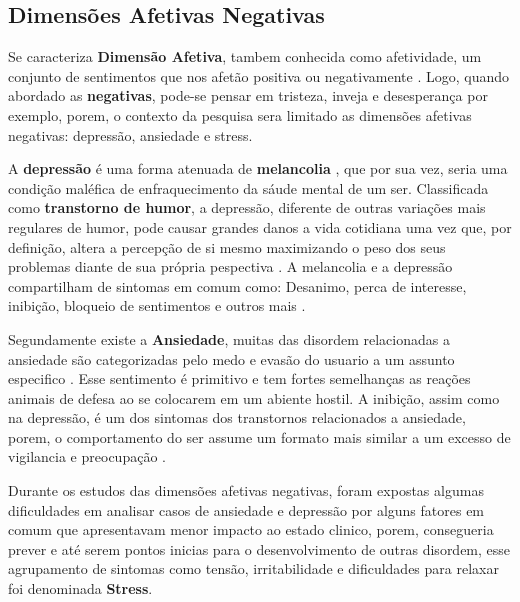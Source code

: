 \subsection{Dimensões Afetivas Negativas}
Se caracteriza \textbf{Dimensão Afetiva}, tambem conhecida como afetividade, um conjunto de sentimentos que nos afetão positiva ou negativamente \cite{pinto2009afetos}. Logo, quando abordado as \textbf{negativas}, pode-se pensar em tristeza, inveja e desesperança por exemplo, porem, o contexto da pesquisa sera limitado as dimensões afetivas negativas: depressão, ansiedade e stress.

A \textbf{depressão} é uma forma atenuada de \textbf{melancolia} \cite{roudinesco2000psicanalise}, que por sua vez, seria uma condição maléfica de enfraquecimento da sáude mental de um ser. Classificada como \textbf{transtorno de humor}, a depressão, diferente de outras variações mais regulares de humor, pode causar grandes danos a vida cotidiana uma vez que, por definição, altera a percepção de si mesmo maximizando o peso dos seus problemas diante de sua própria pespectiva \cite{esteves2006depressao}. A melancolia e a depressão compartilham de sintomas em comum como: Desanimo, perca de interesse, inibição, bloqueio de sentimentos e outros mais \cite[28]{freud2014livro}.

Segundamente existe a \textbf{Ansiedade}, muitas das disordem relacionadas a ansiedade são categorizadas pelo medo e evasão do usuario a um assunto especifico \cite[393]{dsmiv}. Esse sentimento é primitivo e tem fortes semelhanças as reações animais de defesa ao se colocarem em um abiente hostil. A inibição, assim como na depressão, é um dos sintomas dos transtornos relacionados a ansiedade, porem, o comportamento do ser assume um formato mais similar a um excesso de vigilancia e preocupação \cite{margis2003relaccao}.

Durante os estudos das dimensões afetivas negativas, foram expostas algumas dificuldades em analisar casos de ansiedade e depressão por alguns fatores em comum que apresentavam menor impacto ao estado clinico, porem, consegueria prever e até serem pontos inicias para o desenvolvimento de outras disordem, esse agrupamento de sintomas como tensão, irritabilidade e dificuldades para relaxar foi denominada \textbf{Stress}. \cite{lovibond1995structure, ribeiro2004contribuiccao, margis2003relaccao}




